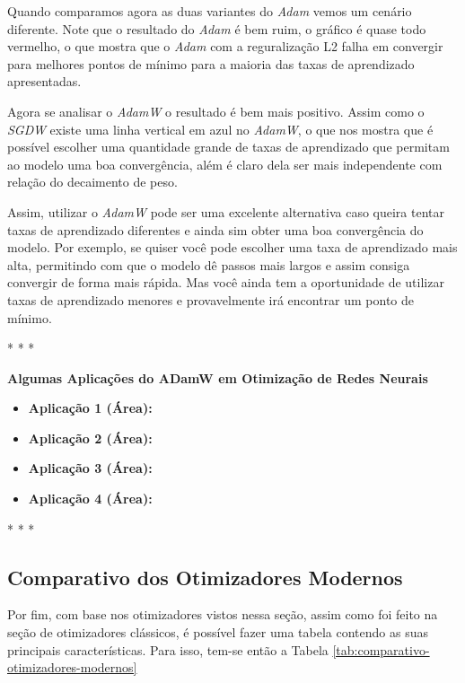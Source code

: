 Quando comparamos agora as duas variantes do \textit{Adam} vemos um cenário diferente. Note que o resultado do \textit{Adam} é bem ruim, o gráfico é quase todo vermelho, o que mostra que o \textit{Adam} com a reguralização L2 falha em convergir para melhores pontos de mínimo para a maioria das taxas de aprendizado apresentadas.

Agora se analisar o \textit{AdamW} o resultado é bem mais positivo. Assim como o \textit{SGDW} existe uma linha vertical em azul no \textit{AdamW}, o que nos mostra que é possível escolher uma quantidade grande de taxas de aprendizado que permitam ao modelo uma boa convergência, além é claro dela ser mais independente com relação do decaimento de peso.

Assim, utilizar o \textit{AdamW} pode ser uma excelente alternativa caso queira tentar taxas de aprendizado diferentes e ainda sim obter uma boa convergência do modelo. Por exemplo, se quiser você pode escolher uma taxa de aprendizado mais alta, permitindo com que o modelo dê passos mais largos e assim consiga convergir de forma mais rápida. Mas você ainda tem a oportunidade de utilizar taxas de aprendizado menores e provavelmente irá encontrar um ponto de mínimo.

\medskip
\begin{center}
 * * *
\end{center}
\medskip

\textbf{Algumas Aplicações do ADamW em Otimização de Redes Neurais}
\vspace{1em}

\begin{itemize}
    \item \textbf{Aplicação 1 (Área):}
    \item \textbf{Aplicação 2 (Área):}
    \item \textbf{Aplicação 3 (Área):}
    \item \textbf{Aplicação 4 (Área):}
\end{itemize}

\medskip
\begin{center}
 * * *
\end{center}
\medskip

\subsection{Comparativo dos Otimizadores Modernos}

Por fim, com base nos otimizadores vistos nessa seção, assim como foi feito na seção de otimizadores clássicos, é possível fazer uma tabela contendo as suas principais características. Para isso, tem-se então a Tabela \ref{tab:comparativo-otimizadores-modernos}

